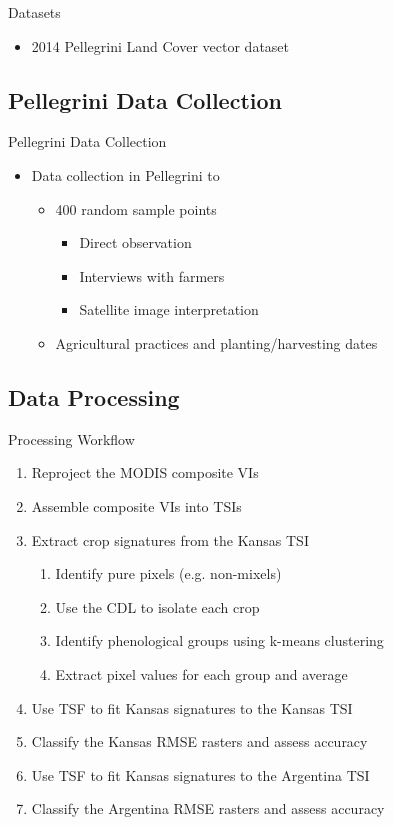 \documentclass[  compress,xcolor={usenames,dvipsnames}]{beamer}
\newcommand{\datenoyear}[2]{%
  \noyear\formatdate{#1}{#2}{1}%
  \aagdate}
\begin{document}
\begin{frame}{Datasets}
\begin{itemize}
  \item<1-> 2014 Pellegrini Land Cover vector dataset
\end{itemize}
\end{frame}


\subsection{Pellegrini Data Collection}
\begin{frame}{Pellegrini Data Collection}
\begin{itemize}
  \item<1-> Data collection in Pellegrini \datenoyear{12}{3} to \datenoyear{3}{4}
  \begin{itemize}
    \item<2-> 400 random sample points
    \begin{itemize}
      \item<3-> Direct observation
      \item<3-> Interviews with farmers
      \item<3-> Satellite image interpretation
    \end{itemize}
    \item<4-> Agricultural practices and planting/harvesting dates
  \end{itemize}
\end{itemize}
\end{frame}


\subsection{Data Processing}
\begin{frame}{Processing Workflow}
\begin{enumerate}
  \item Reproject the MODIS composite VIs
  \item Assemble composite VIs into TSIs
  \item Extract crop signatures from the Kansas TSI
  \begin{enumerate}
    \item Identify pure pixels (e.g. non-mixels)
    \item Use the CDL to isolate each crop
    \item Identify phenological groups using k-means clustering
    \item Extract pixel values for each group and average
  \end{enumerate}
  \item Use TSF to fit Kansas signatures to the Kansas TSI
  \item Classify the Kansas RMSE rasters and assess accuracy
  \item Use TSF to fit Kansas signatures to the Argentina TSI
  \item Classify the Argentina RMSE rasters and assess accuracy
\end{enumerate}
\end{frame}
\end{document}
